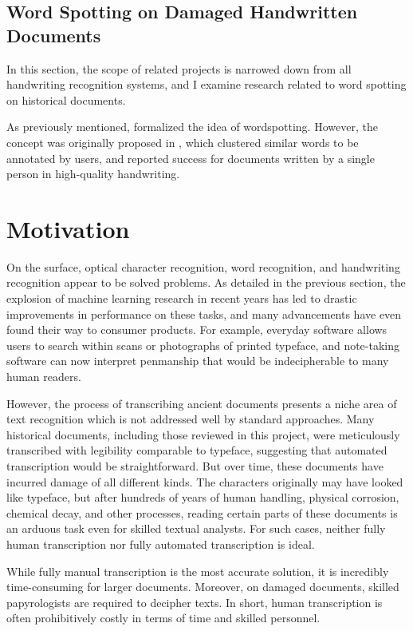 \documentclass[final]{ukthesis}
\begin{document}
\subsection{Word Spotting on Damaged Handwritten Documents}
In this section, the scope of related projects is narrowed down from all handwriting recognition systems, and I examine research related to word spotting on historical documents.

As previously mentioned, \cite{rath2007word} formalized the idea of wordspotting. However, the concept was originally proposed in \cite{manmatha1996word}, which clustered similar words to be annotated by users, and reported success for documents written by a single person in high-quality handwriting.




%
%
\section{Motivation}
On the surface, optical character recognition, word recognition, and handwriting recognition appear to be solved problems. As detailed in the previous section, the explosion of machine learning research in recent years has led to drastic improvements in performance on these tasks, and many advancements have even found their way to consumer products. For example, everyday software allows users to search within scans or photographs of printed typeface, and note-taking software can now interpret penmanship that would be indecipherable to many human readers.

However, the process of transcribing ancient documents presents a niche area of text recognition which is not addressed well by standard approaches. Many historical documents, including those reviewed in this project, were meticulously transcribed with legibility comparable to typeface, suggesting that automated transcription would be straightforward. But over time, these documents have incurred damage of all different kinds. The characters originally may have looked like typeface, but after hundreds of years of human handling, physical corrosion, chemical decay, and other processes, reading certain parts of these documents is an arduous task even for skilled textual analysts. For such cases, neither fully human transcription nor fully automated transcription is ideal.

While fully manual transcription is the most accurate solution, it is incredibly time-consuming for larger documents. Moreover, on damaged documents, skilled papyrologists are required to decipher texts. In short, human transcription is often prohibitively costly in terms of time and skilled personnel.
\end{document}

